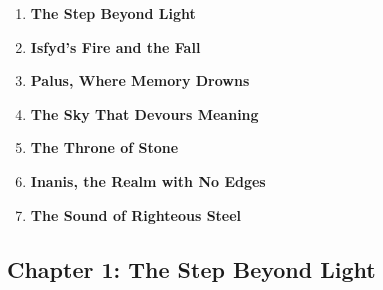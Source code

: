 \documentclass[9pt]{article}
\begin{document}
\begin{enumerate}
    \item \textbf{The Step Beyond Light} 

    \vspace{1em}
    \item \textbf{Isfyd's Fire and the Fall} 

    \vspace{1em}
    \item \textbf{Palus, Where Memory Drowns} 

    \vspace{1em}
    \item \textbf{The Sky That Devours Meaning} 

    \vspace{1em}
    \item \textbf{The Throne of Stone} 

    \vspace{1em}
    \item \textbf{Inanis, the Realm with No Edges}

    \vspace{1em}
    \item \textbf{The Sound of Righteous Steel} 

\end{enumerate}

\newpage

\subsection*{Chapter 1: The Step Beyond Light}

\vspace{1in}
\end{document}
